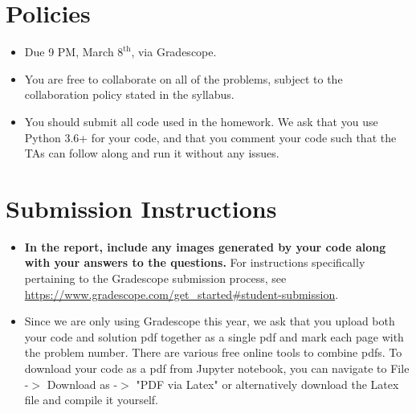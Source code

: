 \newif\ifshowsolutions
\showsolutionstrue







\pagestyle{fancy}


\section*{Policies}
\begin{itemize}
  \item Due 9 PM, March $8^\text{th}$, via Gradescope.
  \item You are free to collaborate on all of the problems, subject to the collaboration policy stated in the syllabus. 
  \item You should submit all code used in the homework. We ask that you use Python 3.6+ for your code, and that you comment your code such that the TAs can follow along and run it without any issues.
\end{itemize}

\section*{Submission Instructions}
\begin{itemize}
   \item \textbf{In the report, include any images generated by your code along with your answers to the questions.} For instructions specifically pertaining to the Gradescope submission process, see \url{https://www.gradescope.com/get_started#student-submission}.
   
   \item Since we are only using Gradescope this year, we ask that you upload both your code and solution pdf together as a single pdf and mark each page with the problem number. There are various free online tools to combine pdfs. To download your code as a pdf from Jupyter notebook, you can navigate to File -$>$ Download as -$>$ "PDF via Latex" or alternatively download the Latex file and compile it yourself.
\end{itemize}

